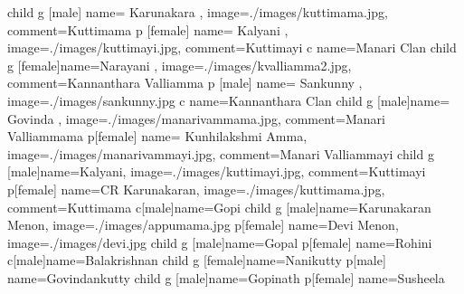 \documentclass{article}
\begin{document}
\begin{landscape}
\begin{genealogypicture}
{{{			child {
    				g [male] {name= Karunakara , image={./images/kuttimama.jpg}, comment={Kuttimama}}
				p [female] {name= Kalyani , image={./images/kuttimayi.jpg}, comment={Kuttimayi}}
				c {name=Manari Clan}
   			}
  		}
  		child {
   			g [female]{name={Narayani }, image={./images/kvalliamma2.jpg}, comment={Kannanthara Valliamma}}
   			p [male] {name={ Sankunny }, image={./images/sankunny.jpg}}
			c {name=Kannanthara Clan}
  		}
  		child {
   			g [male]{name={ Govinda }, image={./images/manarivammama.jpg},  comment={Manari Valliammama}}
   			p[female] {name={ Kunhilakshmi Amma}, image={./images/manarivammayi.jpg},  comment={Manari Valliammayi}}
			child {
   				g [male]{name=Kalyani, image={./images/kuttimayi.jpg}, comment={Kuttimayi}}
   				p[female] {name=CR Karunakaran, image={./images/kuttimama.jpg}, comment={Kuttimama}}
  			}
			c[male]{name=Gopi}
			child {
   				g [male]{name={Karunakaran Menon}, image={./images/appumama.jpg}}
   				p[female] {name={Devi Menon}, image={./images/devi.jpg}}
  			}
			child {
   				g [male]{name=Gopal}
   				p[female] {name=Rohini}
  			}
			c[male]{name=Balakrishnan}
			child {
   				g [female]{name=Nanikutty}
   				p[male] {name=Govindankutty}
  			}
			child {
   				g [male]{name=Gopinath}
   				p[female] {name=Susheela}
  			}
  		}
	}
}

\end{genealogypicture}

\end{landscape}
\end{document}
